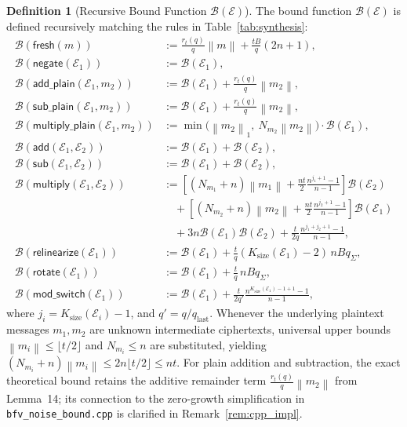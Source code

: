 \documentclass[11pt]{article}
\theoremstyle{definition}
\newtheorem*{definition*}{Definition}
\theoremstyle{remark}
\newcommand{\norm}[1]{\left\lVert #1\right\rVert}
\newcommand{\Sgeo}[1]{\frac{n^{#1+1}-1}{n-1}}
\begin{document}
\begin{definition*}[Recursive Bound Function $\mathcal{B}(\mathcal{E})$]
The bound function $\mathcal{B}(\mathcal{E})$ is defined recursively matching the rules in Table~\ref{tab:synthesis}:
\begin{align*}
\mathcal{B}(\mathsf{fresh}(m)) &:= \frac{r_t(q)}{q}\norm{m} + \frac{tB}{q}(2n+1),\\
\mathcal{B}(\mathsf{negate}(\mathcal{E}_1)) &:= \mathcal{B}(\mathcal{E}_1),\\
\mathcal{B}(\mathsf{add\_plain}(\mathcal{E}_1, m_2)) &:= \mathcal{B}(\mathcal{E}_1) + \frac{r_t(q)}{q}\norm{m_2},\\
\mathcal{B}(\mathsf{sub\_plain}(\mathcal{E}_1, m_2)) &:= \mathcal{B}(\mathcal{E}_1) + \frac{r_t(q)}{q}\norm{m_2},\\
\mathcal{B}(\mathsf{multiply\_plain}(\mathcal{E}_1, m_2)) &:= \min\bigl(\norm{m_2}_1,\ N_{m_2}\norm{m_2}\bigr)\cdot \mathcal{B}(\mathcal{E}_1),\\
\mathcal{B}(\mathsf{add}(\mathcal{E}_1, \mathcal{E}_2)) &:= \mathcal{B}(\mathcal{E}_1) + \mathcal{B}(\mathcal{E}_2),\\
\mathcal{B}(\mathsf{sub}(\mathcal{E}_1, \mathcal{E}_2)) &:= \mathcal{B}(\mathcal{E}_1) + \mathcal{B}(\mathcal{E}_2),\\
\mathcal{B}(\mathsf{multiply}(\mathcal{E}_1, \mathcal{E}_2)) &:=
\left[(N_{m_1}+n)\norm{m_1} + \frac{nt}{2}\Sgeo{j_1}\right]\mathcal{B}(\mathcal{E}_2)\\
&\quad+ \left[(N_{m_2}+n)\norm{m_2} + \frac{nt}{2}\Sgeo{j_2}\right]\mathcal{B}(\mathcal{E}_1)\\
&\quad+ 3n\mathcal{B}(\mathcal{E}_1)\mathcal{B}(\mathcal{E}_2) + \frac{t}{2q}\Sgeo{j_1+j_2},\\
\mathcal{B}(\mathsf{relinearize}(\mathcal{E}_1)) &:= \mathcal{B}(\mathcal{E}_1) + \frac{t}{q}(K_{\mathrm{size}}(\mathcal{E}_1)-2)\,nBq_\Sigma,\\
\mathcal{B}(\mathsf{rotate}(\mathcal{E}_1)) &:= \mathcal{B}(\mathcal{E}_1) + \frac{t}{q}\,nBq_\Sigma,\\
\mathcal{B}(\mathsf{mod\_switch}(\mathcal{E}_1)) &:= \mathcal{B}(\mathcal{E}_1) + \frac{t}{2q'}\Sgeo{K_{\mathrm{size}}(\mathcal{E}_1)-1},
\end{align*}
where $j_i = K_{\mathrm{size}}(\mathcal{E}_i) - 1$, and $q' = q/q_{\mathrm{last}}$.
Whenever the underlying plaintext messages $m_1, m_2$ are unknown intermediate ciphertexts, universal upper bounds $\norm{m_i} \leq \lfloor t/2 \rfloor$ and $N_{m_i} \leq n$ are substituted, yielding $(N_{m_i}+n)\norm{m_i} \leq 2n\lfloor t/2\rfloor \leq nt$.
For plain addition and subtraction, the exact theoretical bound retains the additive remainder term $\frac{r_t(q)}{q}\norm{m_2}$ from Lemma~14; its connection to the zero-growth simplification in \texttt{bfv\_noise\_bound.cpp} is clarified in Remark~\ref{rem:cpp_impl}.
\end{definition*}
\end{document}

